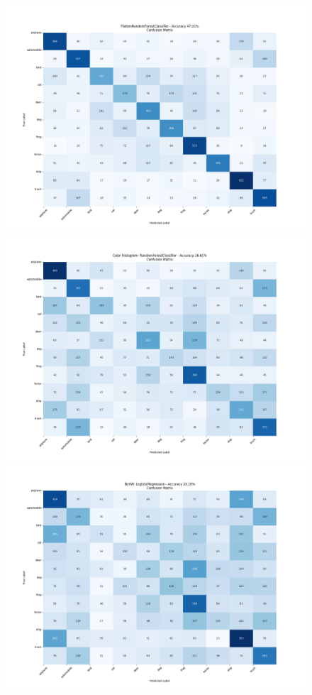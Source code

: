 \begin{figure}
\centering
\includegraphics[scale=0.2]{figures/confusion_matrix_RandomForestClassifier_flatten.png}
\includegraphics[scale=0.2]{figures/confusion_matrix_RandomForestClassifier_color.png}
\includegraphics[scale=0.2]{figures/confusion_matrix_LogisticRegression_bovw_ft.png}

\end{figure}
